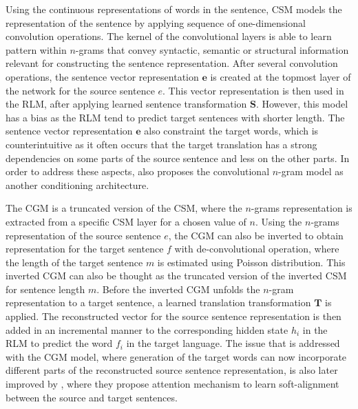 \documentclass[12pt]{extarticle}
\begin{document}
Using the continuous representations of words in the sentence, CSM models the representation of the sentence by applying sequence of one-dimensional convolution operations. The kernel of the convolutional layers is able to learn pattern within $n$-grams that convey syntactic, semantic or structural information relevant for constructing the sentence representation. After several convolution operations, the sentence vector representation $\textbf{e}$ is created at the topmost layer of the network for the source sentence $e$. This vector representation is then used in the RLM, after applying learned sentence transformation $\textbf{S}$. However, this model has a bias as the RLM tend to predict target sentences with shorter length. The sentence vector representation $\textbf{e}$ also constraint the target words, which is counterintuitive as it often occurs that the target translation has a strong dependencies on some parts of the source sentence and less on the other parts. In order to address these aspects, \citep{kalchbrenner-blunsom-2013-recurrent-continuous} also proposes the convolutional $n$-gram model as another conditioning architecture.

The CGM is a truncated version of the CSM, where the $n$-grams representation is extracted from a specific CSM layer for a chosen value of $n$. Using the $n$-grams representation of the source sentence $e$, the CGM can also be inverted to obtain representation for the target sentence $f$ with de-convolutional operation, where the length of the target sentence $m$ is estimated using Poisson distribution. This inverted CGM can also be thought as the truncated version of the inverted CSM for sentence length $m$. Before the inverted CGM unfolds the $n$-gram representation to a target sentence, a learned translation transformation $\textbf{T}$ is applied. The reconstructed vector for the source sentence representation is then added in an incremental manner to the corresponding hidden state $h_{i}$ in the RLM to predict the word $f_{i}$ in the target language. The issue that is addressed with the CGM model, where generation of the target words can now incorporate different parts of the reconstructed source sentence representation, is also later improved by \citep{DBLP:journals/corr/BahdanauCB14}, where they propose attention mechanism to learn soft-alignment between the source and target sentences.
\end{document}
